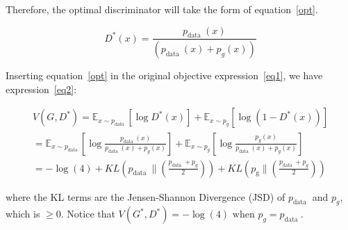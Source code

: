 \documentclass[]{IEEEtran}
\begin{document}
Therefore, the optimal discriminator will take the form of equation~\ref{opt}.

\begin{equation}
D^{*}(x)=\frac{p_{\text {data }}(x)}{\left(p_{\text {data }}(x)+p_{g}(x)\right)}
\label{opt}
\end{equation}

Inserting equation~\ref{opt} in the original objective expression~\ref{eq1}, we have expression~\ref{eq2}:

\begin{equation}
\begin{aligned}
V\left(G, D^{*}\right) =\mathbb{E}_{x \sim p_{\text {data }}}\left[\log D^{*}(x)\right]+\mathbb{E}_{x \sim p_{g}}\left[\log \left(1-D^{*}(x)\right)\right] \\
=\mathbb{E}_{x \sim p_{\text {data }}}\left[\log \frac{p_{\text {data }}(x)}{p_{\text {data }}(x)+p_{g}(x)}\right]+\mathbb{E}_{x \sim p_{g}}\left[\log \frac{p_{g}(x)}{p_{\text {data }}(x)+p_{g}(x)}\right] \\
=-\log (4)+K L\left(p_{\text {data }} \|\left(\frac{p_{\text {data }}+p_{g}}{2}\right)\right)+K L\left(p_{\mathrm{g}} \|\left(\frac{p_{\text {data }}+p_{g}}{2}\right)\right)
\end{aligned}
\label{eq2}
\end{equation}

where the KL terms are the Jensen-Shannon Divergence (JSD) of $p_{\text {data }}$ and $p_{g}$, which is  $\ge 0$. Notice that $V\left(G^{*}, D^{*}\right)=-\log (4) \text { when } p_{g}=p_{\text {data }}$.
\end{document}
